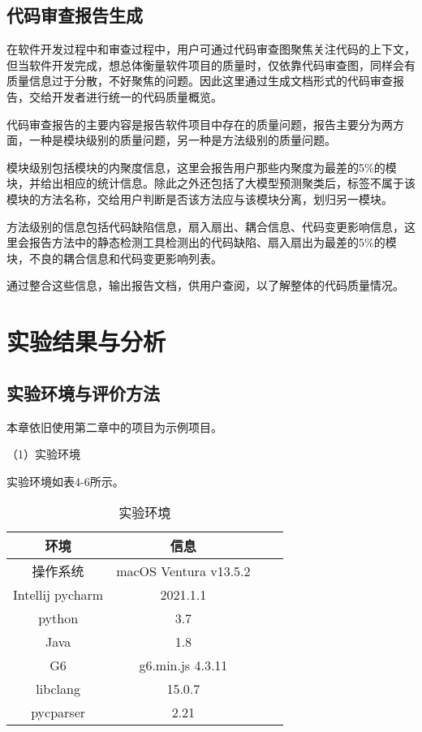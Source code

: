 \subsection{代码审查报告生成}

在软件开发过程中和审查过程中，用户可通过代码审查图聚焦关注代码的上下文，但当软件开发完成，想总体衡量软件项目的质量时，仅依靠代码审查图，同样会有质量信息过于分散，不好聚焦的问题。因此这里通过生成文档形式的代码审查报告，交给开发者进行统一的代码质量概览。

代码审查报告的主要内容是报告软件项目中存在的质量问题，报告主要分为两方面，一种是模块级别的质量问题，另一种是方法级别的质量问题。

模块级别包括模块的内聚度信息，这里会报告用户那些内聚度为最差的5\%的模块，并给出相应的统计信息。除此之外还包括了大模型预测聚类后，标签不属于该模块的方法名称，交给用户判断是否该方法应与该模块分离，划归另一模块。

方法级别的信息包括代码缺陷信息，扇入扇出、耦合信息、代码变更影响信息，这里会报告方法中的静态检测工具检测出的代码缺陷、扇入扇出为最差的5\%的模块，不良的耦合信息和代码变更影响列表。

通过整合这些信息，输出报告文档，供用户查阅，以了解整体的代码质量情况。

\section{实验结果与分析}

\subsection{实验环境与评价方法}

本章依旧使用第二章中的项目为示例项目。

（1）实验环境

实验环境如表4-6所示。

\clearpage

\begin{table}[htbp]
\caption{实验环境}
\vspace{0.5em}\centering\wuhao
\begin{tabular}{cccc}
\toprule
    环境 & 信息 \\
\midrule
操作系统 & macOS Ventura v13.5.2  \\
Intellij pycharm & 2021.1.1   \\
python & 3.7   \\
Java & 1.8   \\
G6 & g6.min.js 4.3.11  \\  
libclang & 15.0.7  \\ 
pycparser & 2.21  \\
\bottomrule
\end{tabular}
\end{table}

